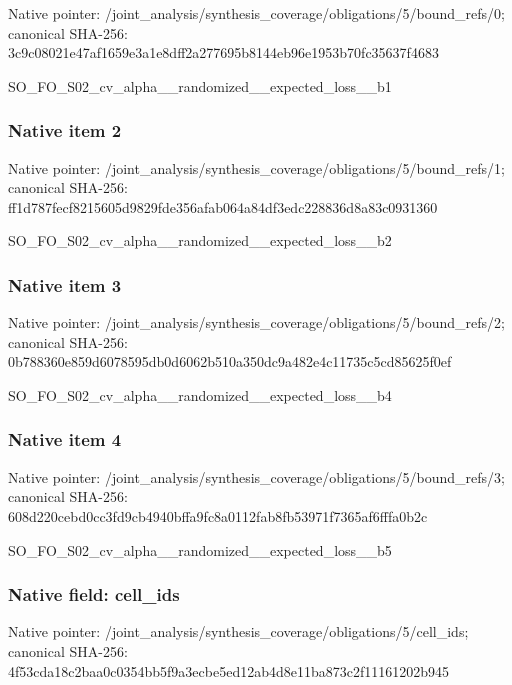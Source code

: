 \documentclass[10pt,a4paper]{article}
\begin{document}
Native pointer: /joint\_analysis/synthesi\allowbreak{}s\_coverage/obligations/5\allowbreak{}/bound\_refs/0; canonical SHA-256: 3c9c08021e47af1659e3a1e8\allowbreak{}dff2a277695b8144eb96e195\allowbreak{}3b70fc35637f4683


SO\_FO\_S02\_cv\_alpha\_\_rand\allowbreak{}omized\_\_expected\_loss\_\_b\allowbreak{}1


\subsubsection{Native item 2}


Native pointer: /joint\_analysis/synthesi\allowbreak{}s\_coverage/obligations/5\allowbreak{}/bound\_refs/1; canonical SHA-256: ff1d787fecf8215605d9829f\allowbreak{}de356afab064a84df3edc228\allowbreak{}836d8a83c0931360


SO\_FO\_S02\_cv\_alpha\_\_rand\allowbreak{}omized\_\_expected\_loss\_\_b\allowbreak{}2


\subsubsection{Native item 3}


Native pointer: /joint\_analysis/synthesi\allowbreak{}s\_coverage/obligations/5\allowbreak{}/bound\_refs/2; canonical SHA-256: 0b788360e859d6078595db0d\allowbreak{}6062b510a350dc9a482e4c11\allowbreak{}735c5cd85625f0ef


SO\_FO\_S02\_cv\_alpha\_\_rand\allowbreak{}omized\_\_expected\_loss\_\_b\allowbreak{}4


\subsubsection{Native item 4}


Native pointer: /joint\_analysis/synthesi\allowbreak{}s\_coverage/obligations/5\allowbreak{}/bound\_refs/3; canonical SHA-256: 608d220cebd0cc3fd9cb4940\allowbreak{}bffa9fc8a0112fab8fb53971\allowbreak{}f7365af6fffa0b2c


SO\_FO\_S02\_cv\_alpha\_\_rand\allowbreak{}omized\_\_expected\_loss\_\_b\allowbreak{}5


\subsubsection{Native field: cell\_ids}


Native pointer: /joint\_analysis/synthesi\allowbreak{}s\_coverage/obligations/5\allowbreak{}/cell\_ids; canonical SHA-256: 4f53cda18c2baa0c0354bb5f\allowbreak{}9a3ecbe5ed12ab4d8e11ba87\allowbreak{}3c2f11161202b945
\end{document}
